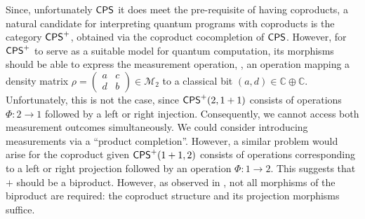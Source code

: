Since, unfortunately $\mathsf{CPS}$ it does meet the pre-requisite of having coproducts,
a natural candidate for interpreting quantum programs with coproducts is the category $\mathsf{CPS}^+$, obtained via the coproduct cocompletion of $\mathsf{CPS}$. However, for $\mathsf{CPS}^+$ to serve as a suitable model for quantum computation, its morphisms should be able to express the measurement operation, \ie, an operation mapping a density matrix $
\rho=\left(\begin{smallmatrix}
    a & c \\
    d & b
  \end{smallmatrix}\right)
  \in \mathcal{M}_2$ to a classical bit $(a,d) \in \mathbb{C} \oplus \mathbb{C}$. 
Unfortunately, this is not the case, since $\mathsf{CPS}^+(2, 1+1)$ consists of operations $\Phi: 2 \to 1$ followed by a left or right injection. Consequently, we cannot access both measurement outcomes simultaneously. We could consider introducing measurements via a ``product completion''. However, a similar problem would arise for the coproduct given $\mathsf{CPS}^+(1+1, 2)$ consists of operations corresponding to a left or right projection followed by an operation $\Phi: 1 \to 2$. This suggests that \( + \) should be a biproduct. However, as observed in \cite{selinger2004towards}, not all morphisms of the biproduct are required: the coproduct structure and its projection morphisms suffice. 

